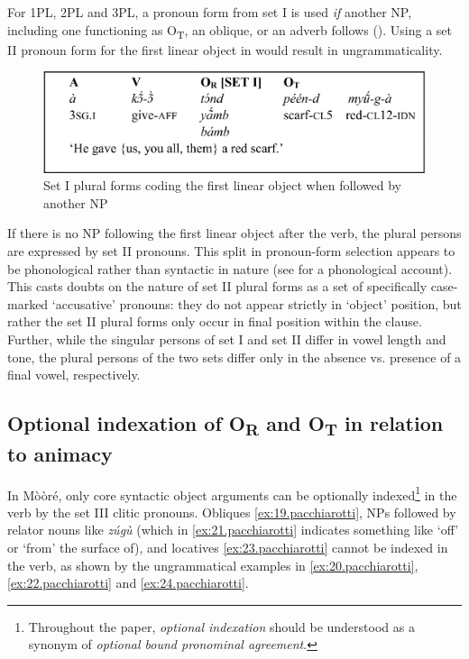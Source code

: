 \documentclass[output=paper]{langsci/langscibook}
\begin{document}
For 1PL, 2PL and 3PL, a pronoun form from set I is used \textit{if} another NP, including one functioning as O\textsubscript{T}, an oblique, or an adverb follows (). Using a set II pronoun form for the first linear object in  would result in ungrammaticality.

\begin{figure}[h]
\includegraphics[width=\textwidth]{figures/pacchiarottifig2}
\caption{Set I plural forms coding the first linear object when followed by another NP}
\label{fig:2.pacchiarotti}
\end{figure}

If there is no NP following the first linear object after the verb, the plural persons are expressed by set II pronouns. This split in pronoun-form selection appears to be phonological rather than syntactic in nature (see \citealt{peterson1971} for a phonological account). This casts doubts on the nature of set II plural forms as a set of specifically case-marked `accusative' pronouns: they do not appear strictly in `object' position, but rather the set II plural forms only occur in final position within the clause. Further, while the singular persons of set I and set II differ in vowel length and tone, the plural persons of the two sets differ only in the absence vs. presence of a final vowel, respectively. 

\subsection{Optional indexation of O\textsubscript{R} and O\textsubscript{T} in relation to animacy}\label{§4.4:optional.pacchiarotti}

In Mòòré, only core syntactic object arguments can be optionally indexed\footnote{Throughout the paper, \textit{optional indexation} should be understood as a synonym of \textit{optional bound pronominal agreement}.} in the verb by the set III clitic pronouns. Obliques \ref{ex:19.pacchiarotti}, NPs followed by relator nouns like \emph{z\'{u}g\`{u}} (which in \ref{ex:21.pacchiarotti} indicates something like `off' or `from' the surface of), and locatives \ref{ex:23.pacchiarotti} cannot be indexed in the verb, as shown by the ungrammatical examples in \ref{ex:20.pacchiarotti}, \ref{ex:22.pacchiarotti} and \ref{ex:24.pacchiarotti}. 
\end{document}
